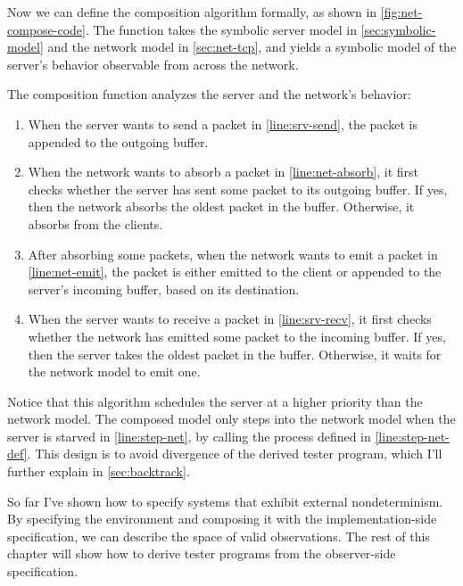 Now we can define the composition algorithm formally, as shown in
\autoref{fig:net-compose-code}.  The function takes the symbolic server model
in \autoref{sec:symbolic-model} and the network model in \autoref{sec:net-tcp},
and yields a symbolic model of the server's behavior observable from across the
network.

The composition function analyzes the server and the network's behavior:
\begin{enumerate}
\item When the server wants to send a packet in \autoref{line:srv-send}, the
packet is appended to the outgoing buffer.
\item When the network wants to absorb a packet in \autoref{line:net-absorb},
it first checks whether the server has sent some packet to its outgoing buffer.
If yes, then the network absorbs the oldest packet in the buffer.  Otherwise, it
absorbs from the clients.
\item After absorbing some packets, when the network wants to emit a packet in
\autoref{line:net-emit}, the packet is either emitted to the client or appended
to the server's incoming buffer, based on its destination.
\item When the server wants to receive a packet in \autoref{line:srv-recv},
it first checks whether the network has emitted some packet to the incoming
buffer.  If yes, then the server takes the oldest packet in the buffer.
Otherwise, it waits for the network model to emit one.
\end{enumerate}

Notice that this algorithm schedules the server at a higher priority than the
network model.  The composed model only steps into the network model when the
server is starved in \autoref{line:step-net}, by calling the 
process defined in \autoref{line:step-net-def}.  This design is to avoid
divergence of the derived tester program, which I'll further explain in
\autoref{sec:backtrack}.

So far I've shown how to specify systems that exhibit external nondeterminism.
By specifying the environment and composing it with the implementation-side
specification, we can describe the space of valid observations.  The rest of
this chapter will show how to derive tester programs from the observer-side
specification.
